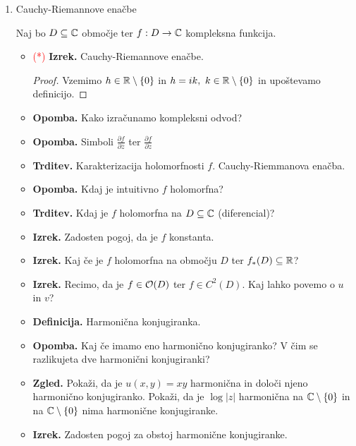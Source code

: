 \begin{enumerate}
    \item Cauchy-Riemannove enačbe
    
    Naj bo \(D \subseteq \mathbb{C}\) območje ter \(f: D \to \mathbb{C}\) kompleksna funkcija.
    \begin{itemize}
        \item \textcolor{red}{(*)} \textbf{Izrek.} Cauchy-Riemannove enačbe. 
        \begin{proof}
            Vzemimo \(h \in \mathbb{R} \setminus \{0\}\) in \(h = ik,\ k \in \mathbb{R} \setminus \{0\}\) in upoštevamo definicijo.
        \end{proof}
        \item \textbf{Opomba.} Kako izračunamo kompleksni odvod?
        \item \textbf{Opomba.} Simboli \(\frac{\partial f}{\partial \overline{z}}\) ter \(\frac{\partial f}{\partial z}\)
        \item \textbf{Trditev.} Karakterizacija holomorfnosti \(f\). Cauchy-Riemmanova enačba.
        \item \textbf{Opomba.} Kdaj je intuitivno \(f\) holomorfna?
        \item \textbf{Trditev.} Kdaj je \(f\) holomorfna na \(D \subseteq \mathbb{C}\) (diferencial)?
        \item \textbf{Izrek.} Zadosten pogoj, da je \(f\) konstanta.
        \item \textbf{Izrek.} Kaj če je \(f\) holomorfna na območju \(D\) ter \(f_{*}(D) \subseteq \mathbb{R}\)?
        \item \textbf{Izrek.} Recimo, da je \(f \in \mathcal{O}(D)\) ter \(f \in C^2(D)\). Kaj lahko povemo o \(u\) in \(v\)?
        \item \textbf{Definicija.} Harmonična konjugiranka.
        \item \textbf{Opomba.} Kaj če imamo eno harmonično konjugiranko? V čim se razlikujeta dve harmonični konjugiranki?
        \item \textbf{Zgled.} Pokaži, da je \(u(x, y) = xy\) harmonična in določi njeno harmonično konjugiranko.  Pokaži, da je \(\log |z|\) harmonična na \(\mathbb{C} \setminus \{0\}\) in na \(\mathbb{C} \setminus \{0\}\) nima harmonične konjugiranke.
        \item \textbf{Izrek.} Zadosten pogoj za obstoj harmonične konjugiranke.
    \end{itemize}


\end{enumerate}
